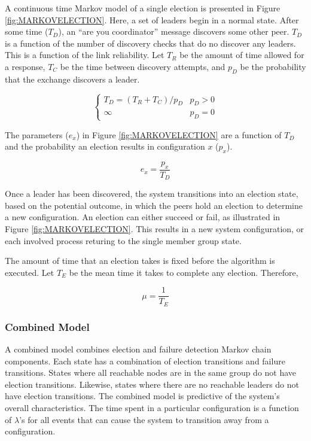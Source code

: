 A continuous time Markov model of a single election is presented in Figure \ref{fig:MARKOVELECTION}.
Here, a set of leaders begin in a normal state.
After some time ($T_{D}$), an ``are you coordinator'' message discovers some other peer.
$T_{D}$ is a function of the number of discovery checks that do no discover any leaders. 
This is a function of the link reliability.
Let $T_{R}$ be the amount of time allowed for a response, $T_{C}$ be the time between
discovery attempts, and $p_{D}$ be the probability that the exchange discovers a leader.

\begin{equation}
\begin{cases}
T_{D} = ( T_{R}+T_{C} ) / p_{D} & p_{D} > 0 \\
\infty & p_{D} = 0
\end{cases}
\end{equation}

The parameters ($e_x$) in Figure \ref{fig:MARKOVELECTION} are a function of $T_{D}$ and the probability an election results in configuration $x$ ($p_{x}$).

\begin{equation}
e_x = \frac{p_{x}}{T_{D}}
\end{equation}

Once a leader has been discovered, the system transitions into an election state, based on the potential outcome, in which the peers hold an election to determine a new configuration.
An election can either succeed or fail, as illustrated in Figure \ref{fig:MARKOVELECTION}. 
This results in a new system configuration, or each involved process returing to the single member group state.
 
The amount of time that an election takes is fixed before the algorithm is executed. 
Let $T_{E}$ be the mean time it takes to complete any election. Therefore,

\begin{equation}
\mu = \frac{1}{T_{E}}
\end{equation}

\subsubsection{Combined Model}

A combined model combines election and failure detection Markov chain components.
Each state has a combination of election transitions and failure transitions.
States where all reachable nodes are in the same group do not have election transitions.
Likewise, states where there are no reachable leaders do not have election transitions.                                                        
The combined model is predictive of the system's overall characteristics.
The time spent in a particular configuration is a function of $\lambda$'s for all events that can cause the system to transition away from a configuration. 

